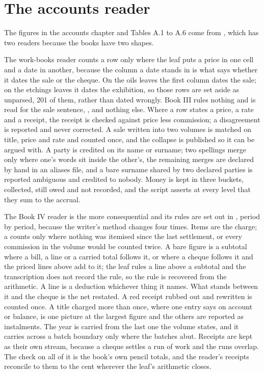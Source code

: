 \section{The accounts reader}

The figures in the accounts chapter and Tables A.1 to A.6 come from , which has two readers because the books have two shapes.

The work-books reader counts a row only where the leaf puts a price in one cell and a date in another, because the column a date stands in is what says whether it dates the sale or the cheque. On the oils leaves the first column dates the sale; on the etchings leaves it dates the exhibition, so those rows are set aside as unparsed, 201 of them, rather than dated wrongly. Book III rules nothing and is read for the sale sentence, , and nothing else. Where a row states a price, a rate and a receipt, the receipt is checked against price less commission; a disagreement is reported and never corrected. A sale written into two volumes is matched on title, price and rate and counted once, and the collapse is published so it can be argued with. A party is credited on its name or surname; two spellings merge only where one's words sit inside the other's, the remaining merges are declared by hand in an aliases file, and a bare surname shared by two declared parties is reported ambiguous and credited to nobody. Money is kept in three buckets, collected, still owed and not recorded, and the script asserts at every level that they sum to the accrual.

The Book IV reader is the more consequential and its rules are set out in , period by period, because the writer's method changes four times. Items are the charge; a  counts only where nothing was itemised since the last settlement, or every commission in the volume would be counted twice. A bare figure is a subtotal where a bill, a  line or a carried total follows it, or where a cheque follows it and the priced lines above add to it; the leaf rules a line above a subtotal and the transcription does not record the rule, so the rule is recovered from the arithmetic. A  line is a deduction whichever thing it names. What stands between it and the cheque is the net restated. A red receipt rubbed out and rewritten is counted once. A title charged more than once, where one entry says on account or balance, is one picture at the largest figure and the others are reported as instalments. The year is carried from the last one the volume states, and it carries across a batch boundary only where the batches abut. Receipts are kept as their own stream, because a cheque settles a run of work and the runs overlap. The check on all of it is the book's own pencil totals, and the reader's receipts reconcile to them to the cent wherever the leaf's arithmetic closes.

